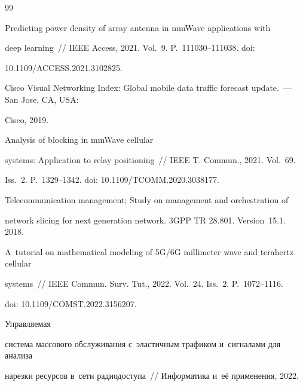  {\small\frenchspacing

{%


\begin{thebibliography}{99}


 Predicting power density of array antenna in mmWave applications with 

deep learning~/\!\!/ IEEE Access, 2021. Vol.~9. P.~111030--111038. doi: 

10.1109\!/\!ACCESS.2021.3102825.


Cisco Visual Networking Index: Global mobile data traffic forecast update.~--- San Jose, CA, USA: 

Cisco, 2019.


 Analysis of blocking in mmWave cellular 

systems: Application to relay positioning~/\!\!/ IEEE T. Commun., 2021. Vol.~69. 

Iss.~2. P.~1329--1342. doi: 10.1109\!/\!TCOMM.2020.3038177.


Telecommunication management; Study on management and orchestration of 

network slicing for next generation network. 3GPP TR 28.801.  Version~15.1.  2018.



A~tutorial on mathematical modeling of 5G\!/\!6G millimeter wave and terahertz cellular 

systems~/\!\!/ IEEE Commun. Surv. Tut., 2022. Vol.~24. Iss.~2. P.~1072--1116. 

doi: 10.1109\!/\!COMST.2022.3156207.


 Управ\-ля\-емая 

сис\-те\-ма массового обслуживания с~эластичным трафиком и~сигналами для анализа 

нарезки ресурсов в~сети радиодоступа~/\!\!/ Информатика и~её применения, 2022. 


\end{thebibliography}}}
